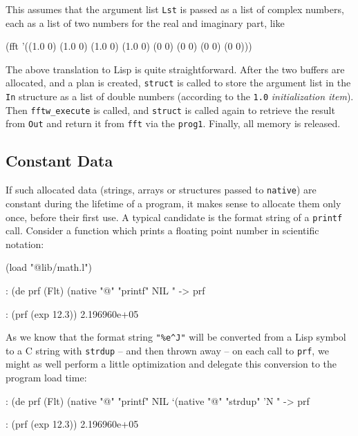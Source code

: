 This assumes that the argument list \texttt{Lst} is passed as a list of
complex numbers, each as a list of two numbers for the real and
imaginary part, like

\begin{wideverbatim}
(fft '((1.0 0) (1.0 0) (1.0 0) (1.0 0) (0 0) (0 0) (0 0) (0 0)))
\end{wideverbatim}

The above translation to Lisp is quite straightforward. After the two
buffers are allocated, and a plan is created, \texttt{struct} is called
to store the argument list in the \texttt{In} structure as a list of
double numbers (according to the \texttt{1.0}
\emph{initialization item}). Then
\texttt{fftw\_execute} is called, and \texttt{struct} is called again to
retrieve the result from \texttt{Out} and return it from \texttt{fft}
via the \texttt{prog1}. Finally, all memory is released.

\subsection{Constant Data}
\label{sec:native-constant-data}

If such allocated data (strings, arrays or structures passed to
\texttt{native}) are constant during the lifetime of a program, it makes
sense to allocate them only once, before their first use. A typical
candidate is the format string of a \texttt{printf} call. Consider a
function which prints a floating point number in scientific notation:

\begin{wideverbatim}
(load "@lib/math.l")

: (de prf (Flt)
   (native "@" "printf" NIL "%
-> prf

: (prf (exp 12.3))
2.196960e+05
\end{wideverbatim}

As we know that the format string \texttt{"\%e\^{}J"} will be converted
from a Lisp symbol to a C string with \texttt{strdup} -- and then thrown
away -- on each call to \texttt{prf}, we might as well perform a little
optimization and delegate this conversion to the program load time:

\begin{wideverbatim}
: (de prf (Flt)
   (native "@" "printf" NIL `(native "@" "strdup" 'N "%
-> prf

: (prf (exp 12.3))
2.196960e+05
\end{wideverbatim}

